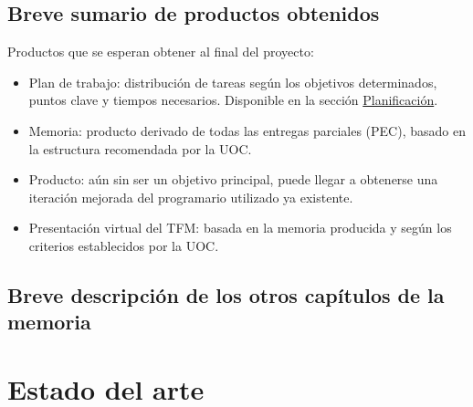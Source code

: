 \documentclass[IB,BIB]{TFUOC}%
\begin{document}
\section{Breve sumario de productos obtenidos}



Productos que se esperan obtener al final del proyecto:

{\small
\begin{itemize}
    \item Plan de trabajo: distribución de tareas según los objetivos determinados, puntos clave y tiempos necesarios. Disponible en la sección \hyperref[Planificación]{Planificación}.
    \item Memoria: producto derivado de todas las entregas parciales (PEC), basado en la estructura recomendada por la UOC.
    \item Producto: aún sin ser un objetivo principal, puede llegar a obtenerse una iteración mejorada del programario utilizado ya existente.
    \item Presentación virtual del TFM: basada en la memoria producida y según los criterios establecidos por la UOC.
\end{itemize}}


\section{Breve descripción de los otros capítulos de la memoria}





\chapter{Estado del arte}
\end{document}
